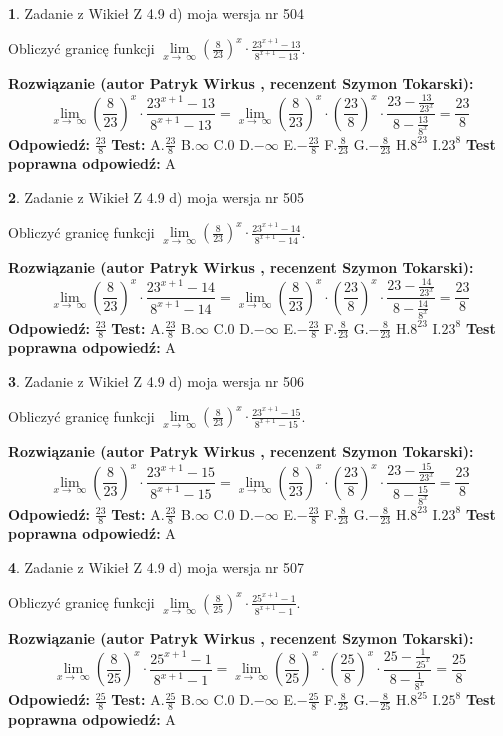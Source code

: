 \documentclass[12pt, a4paper]{article}
\theoremstyle{definition} %
\newtheorem{zad}{}
\newcommand{\zadStart}[1]{\begin{zad}#1\newline}
\newcommand{\zadStop}{\end{zad}}
\newcommand{\rozwStart}[2]{\noindent \textbf{Rozwiązanie (autor #1 , recenzent #2): }\newline}
\newcommand{\rozwStop}{\newline}
\newcommand{\odpStart}{\noindent \textbf{Odpowiedź:}\newline}
\newcommand{\odpStop}{\newline}
\newcommand{\testStart}{\noindent \textbf{Test:}\newline}
\newcommand{\testStop}{\newline}
\newcommand{\kluczStart}{\noindent \textbf{Test poprawna odpowiedź:}\newline}
\newcommand{\kluczStop}{\newline}
\begin{document}
\zadStart{Zadanie z Wikieł Z 4.9 d) moja wersja nr 504}


Obliczyć granicę funkcji  $\lim\limits_{x\to\ \infty}(\frac{8}{23})^{x}\cdot\frac{23^{x+1}-13}{8^{x+1}-13}$.
\zadStop
\rozwStart{Patryk Wirkus}{Szymon Tokarski}
$$\lim\limits_{x\to\ \infty}(\frac{8}{23})^{x}\cdot\frac{23^{x+1}-13}{8^{x+1}-13}=\lim\limits_{x\to\ \infty}(\frac{8}{23})^{x}\cdot(\frac{23}{8})^{x} \cdot \frac{23-\frac{13}{23^{x}}}{8-\frac{13}{8^{x}}} = \frac{23}{8}$$
\rozwStop
\odpStart
$\frac{23}{8}$
\odpStop
\testStart
A.$\frac{23}{8}$ B.$\infty$ C.$0$ D.$-\infty$ E.$-\frac{23}{8}$
F.$\frac{8}{23}$ G.$-\frac{8}{23}$
H.$8^{23}$
I.$23^{8}$
\testStop
\kluczStart
A
\kluczStop



\zadStart{Zadanie z Wikieł Z 4.9 d) moja wersja nr 505}


Obliczyć granicę funkcji  $\lim\limits_{x\to\ \infty}(\frac{8}{23})^{x}\cdot\frac{23^{x+1}-14}{8^{x+1}-14}$.
\zadStop
\rozwStart{Patryk Wirkus}{Szymon Tokarski}
$$\lim\limits_{x\to\ \infty}(\frac{8}{23})^{x}\cdot\frac{23^{x+1}-14}{8^{x+1}-14}=\lim\limits_{x\to\ \infty}(\frac{8}{23})^{x}\cdot(\frac{23}{8})^{x} \cdot \frac{23-\frac{14}{23^{x}}}{8-\frac{14}{8^{x}}} = \frac{23}{8}$$
\rozwStop
\odpStart
$\frac{23}{8}$
\odpStop
\testStart
A.$\frac{23}{8}$ B.$\infty$ C.$0$ D.$-\infty$ E.$-\frac{23}{8}$
F.$\frac{8}{23}$ G.$-\frac{8}{23}$
H.$8^{23}$
I.$23^{8}$
\testStop
\kluczStart
A
\kluczStop



\zadStart{Zadanie z Wikieł Z 4.9 d) moja wersja nr 506}


Obliczyć granicę funkcji  $\lim\limits_{x\to\ \infty}(\frac{8}{23})^{x}\cdot\frac{23^{x+1}-15}{8^{x+1}-15}$.
\zadStop
\rozwStart{Patryk Wirkus}{Szymon Tokarski}
$$\lim\limits_{x\to\ \infty}(\frac{8}{23})^{x}\cdot\frac{23^{x+1}-15}{8^{x+1}-15}=\lim\limits_{x\to\ \infty}(\frac{8}{23})^{x}\cdot(\frac{23}{8})^{x} \cdot \frac{23-\frac{15}{23^{x}}}{8-\frac{15}{8^{x}}} = \frac{23}{8}$$
\rozwStop
\odpStart
$\frac{23}{8}$
\odpStop
\testStart
A.$\frac{23}{8}$ B.$\infty$ C.$0$ D.$-\infty$ E.$-\frac{23}{8}$
F.$\frac{8}{23}$ G.$-\frac{8}{23}$
H.$8^{23}$
I.$23^{8}$
\testStop
\kluczStart
A
\kluczStop



\zadStart{Zadanie z Wikieł Z 4.9 d) moja wersja nr 507}


Obliczyć granicę funkcji  $\lim\limits_{x\to\ \infty}(\frac{8}{25})^{x}\cdot\frac{25^{x+1}-1}{8^{x+1}-1}$.
\zadStop
\rozwStart{Patryk Wirkus}{Szymon Tokarski}
$$\lim\limits_{x\to\ \infty}(\frac{8}{25})^{x}\cdot\frac{25^{x+1}-1}{8^{x+1}-1}=\lim\limits_{x\to\ \infty}(\frac{8}{25})^{x}\cdot(\frac{25}{8})^{x} \cdot \frac{25-\frac{1}{25^{x}}}{8-\frac{1}{8^{x}}} = \frac{25}{8}$$
\rozwStop
\odpStart
$\frac{25}{8}$
\odpStop
\testStart
A.$\frac{25}{8}$ B.$\infty$ C.$0$ D.$-\infty$ E.$-\frac{25}{8}$
F.$\frac{8}{25}$ G.$-\frac{8}{25}$
H.$8^{25}$
I.$25^{8}$
\testStop
\kluczStart
A
\kluczStop
\end{document}
